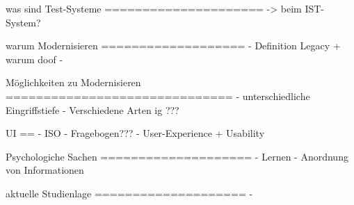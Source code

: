 was sind Test-Systeme
=====================
-> beim IST-System?

warum Modernisieren
===================
- Definition Legacy + warum doof
- 

Möglichkeiten zu Modernisieren
==============================
- unterschiedliche Eingriffstiefe
- Verschiedene Arten ig ???

UI
==
- ISO
- Fragebogen???
- User-Experience + Usability

Psychologiche Sachen
====================
- Lernen
- Anordnung von Informationen

aktuelle Studienlage
====================
- 
